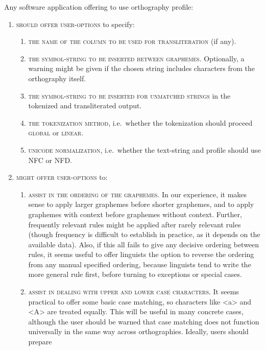 Any software application offering to use orthography profile:

\begin{enumerate}
	\def\labelenumi{\arabic{enumi}.} \item \textsc{should offer
	user-options} to specify: \begin{enumerate}
		\def\labelenumii{\arabic{enumii}.} \item \textsc{the name of the
		column to be used for transliteration} (if any).  \item
		\textsc{the symbol-string to be inserted between graphemes.}
		Optionally, a warning might be given if the chosen string
		includes characters from the orthography itself.  \item
		\textsc{the symbol-string to be inserted for unmatched strings}
		in the tokenized and transliterated output.  \item \textsc{the
		tokenization method}, i.e.~whether the tokenization should
		proceed \textsc{global} or \textsc{linear}.  \item
		\textsc{unicode normalization}, i.e.~whether the text-string and
		profile should use \textsc{NFC} or \textsc{NFD}.
	\end{enumerate} \item \textsc{might offer user-options }to:
	\begin{enumerate}
		\def\labelenumii{\arabic{enumii}.} \setcounter{enumii}{5} \item
		\textsc{assist in the ordering of the graphemes.} In our
		experience, it makes sense to apply larger graphemes before
		shorter graphemes, and to apply graphemes with context before
		graphemes without context. Further, frequently relevant rules
		might be applied after rarely relevant rules (though frequency
		is difficult to establish in practice, as it depends on the
		available data). Also, if this all fails to give any decisive
		ordering between rules, it seems useful to offer linguists the
		option to reverse the ordering from any manual specified
		ordering, because linguists tend to write the more general rule
		first, before turning to exceptions or special cases.  \item
		\textsc{assist in dealing with upper and lower case characters.}
		It seems practical to offer some basic case matching, so
		characters like <a> and <A> are treated equally. This will be
		useful in many concrete cases, although the user should be
		warned that case matching does not function universally in the
		same way across orthographies. Ideally, users should prepare

\end{enumerate}
\end{enumerate}

